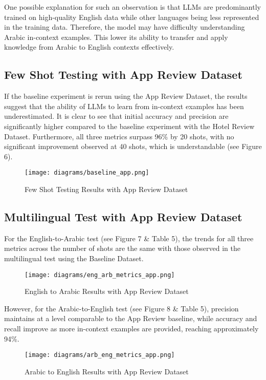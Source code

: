 \documentclass[sigconf, nonacm]{acmart}
\theoremstyle{definition}
\begin{document}
One possible explanation for such an observation is that LLMs are predominantly trained on high-quality English data while other languages being less represented in the training data. Therefore, the model may have difficulty understanding Arabic in-context examples. This lower its ability to transfer and apply knowledge from Arabic to English contexts effectively.

\subsection{Few Shot Testing with App Review Dataset}

If the baseline experiment is rerun using the App Review Dataset, the results suggest that the ability of LLMs to learn from in-context examples has been underestimated. It is clear to see that initial accuracy and precision are significantly higher compared to the baseline experiment with the Hotel Review Dataset. Furthermore, all three metrics surpass 96\% by 20 shots, with no significant improvement observed at 40 shots, which is understandable (see Figure 6).

\begin{figure}[h]
  \centering
  \texttt{[image: diagrams/baseline\_app.png]}
  \caption{Few Shot Testing Results with App Review Dataset}
\end{figure}

\subsection{Multilingual Test with App Review Dataset}

For the English-to-Arabic test (see Figure 7 \& Table 5), the trends for all three metrics across the number of shots are the same with those observed in the multilingual test using the Baseline Dataset.

\begin{figure}[h]
  \centering
  \texttt{[image: diagrams/eng\_arb\_metrics\_app.png]}
  \caption{English to Arabic Results with App Review Dataset}
\end{figure}

However, for the Arabic-to-English test (see Figure 8 \& Table 5), precision maintains at a level comparable to the App Review baseline, while accuracy and recall improve as more in-context examples are provided, reaching approximately 94\%.

\begin{figure}[h]
  \centering
  \texttt{[image: diagrams/arb\_eng\_metrics\_app.png]}
  \caption{Arabic to English Results with App Review Dataset}
\end{figure}
\end{document}
